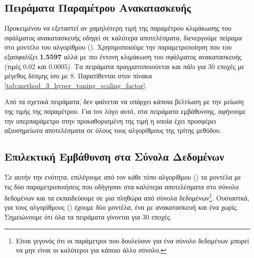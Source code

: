 \subsection{Πειράματα Παραμέτρου Ανακατασκευής}

Προκειμένου να εξεταστεί αν χαμηλότερη τιμή της παραμέτρου κλιμάκωσης του σφάλματος ανακατασκευής οδηγεί σε καλύτερα αποτελέσματα, διενεργούμε πείραμα στο μοντέλο του αλγορίθμου (). Χρησιμοποιούμε την παραμετροποίηση που του εξασφαλίζει  \textbf{1.5597} αλλά με πιο έντονη κλιμάκωση του σφάλματος ανακατασκευής (τιμές $0.02$ και $0.0005$). Τα πειράματα πραγματοποιούνται και πάλι για 30 εποχές με μέγεθος δέσμης ίσο με 8. Παρατίθενται στον πίνακα \ref{tab:method_3_hyper_tuning_scaling_factor}.


\begin{table}[h]
    \begin{center}
    \end{center}
    \caption[]{\label{tab:method_3_hyper_tuning_scaling_factor}Αποτελέσματα πειραμάτων για την εύρεση της βέλτιστης τιμής του παράγοντα κλιμάκωσης του σφάλματος ανακατασκευής στο σύνολο δεδομένων . Τα πειράματα πραγματοποιήθηκαν για 30 εποχές με μέγεθος δέσμης ίσο με 8.} 
\end{table}

Από τα σχετικά πειράματα, δεν φαίνεται να υπάρχει κάποια βελτίωση με την μείωση της τιμής της παραμέτρου. Για τον λόγο αυτό, στα πειράματα εμβάθυνσης, αφήνουμε την υπερπαράμετρο στην προκαθορισμένη της τιμή η οποία έχει προσφέρει αξιοσημείωτα αποτελέσματα σε όλους τους αλγορίθμους της τρίτης μεθόδου.

\subsection{Επιλεκτική Εμβάθυνση στα Σύνολα Δεδομένων}
Σε αυτήν την ενότητα, επιλέγουμε από τον κάθε τύπο αλγορίθμου () τα μοντέλα με τις δύο παραμετροποιήσεις που οδήγησαν στα καλύτερα αποτελέσματα στο σύνολο δεδομένων  και τα εκπαιδεύουμε σε μια πληθώρα από σύνολα δεδομένων\footnote{Είναι γεγονός ότι οι παράμετροι που δουλεύουν για ένα σύνολο δεδομένων μπορεί να μην είναι οι καλύτεροι για κάποιο άλλο σύνολο.}. Ουσιαστκά, για τους αλγορίθμους () έχουμε δύο μοντέλα, ένα με ανακατασκευή και ένα χωρίς. Σημειώνουμε ότι όλα τα πειράματα γίνονται για 30 εποχές.\par

